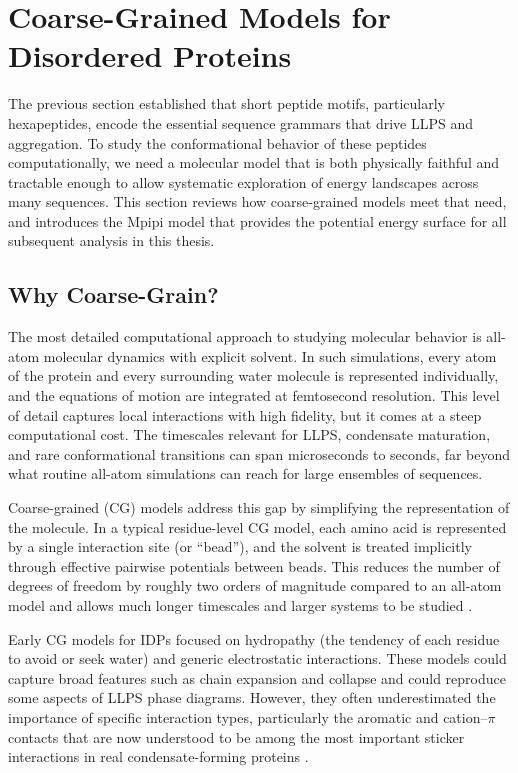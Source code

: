 \section{Coarse-Grained Models for Disordered Proteins}\label{sec:cg-models}

The previous section established that short peptide motifs, particularly hexapeptides, encode the essential sequence grammars that drive LLPS and aggregation. To study the conformational behavior of these peptides computationally, we need a molecular model that is both physically faithful and tractable enough to allow systematic exploration of energy landscapes across many sequences. This section reviews how coarse-grained models meet that need, and introduces the Mpipi model that provides the potential energy surface for all subsequent analysis in this thesis.

\subsection{Why Coarse-Grain?}

The most detailed computational approach to studying molecular behavior is
all-atom molecular dynamics with explicit solvent. In such simulations, every
atom of the protein and every surrounding water molecule is represented
individually, and the equations of motion are integrated at femtosecond
resolution. This level of detail captures local interactions with high fidelity,
but it comes at a steep computational cost. The timescales relevant for LLPS,
condensate maturation, and rare conformational transitions can span microseconds
to seconds, far beyond what routine all-atom simulations can reach for large
ensembles of sequences.

Coarse-grained (CG) models address this gap by simplifying the representation
of the molecule. In a typical residue-level CG model, each amino acid is
represented by a single interaction site (or ``bead''), and the solvent is
treated implicitly through effective pairwise potentials between beads. This
reduces the number of degrees of freedom by roughly two orders of magnitude
compared to an all-atom model and allows much longer timescales and larger
systems to be studied \cite{Dignon2020Review,Dignon2018HPS}.

Early CG models for IDPs focused on hydropathy (the tendency of each residue to
avoid or seek water) and generic electrostatic interactions. These models could
capture broad features such as chain expansion and collapse and could reproduce
some aspects of LLPS phase diagrams. However, they often underestimated the
importance of specific interaction types, particularly the aromatic and
cation--$\pi$ contacts that are now understood to be among the most important
sticker interactions in real condensate-forming proteins \cite{Das2020Comparative,Dignon2020Review,Dignon2018HPS,Regy2021ImprovedHPS,Vernon2018PiPi}.


